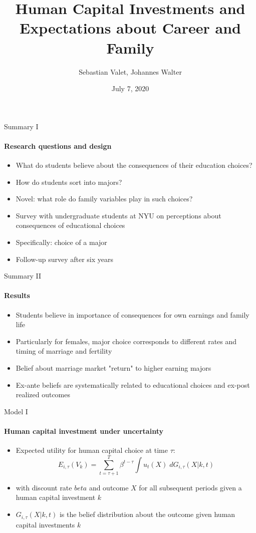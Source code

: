 \documentclass[12pt]{beamer}
\author{Sebastian Valet, Johannes Walter}
\title{Human Capital Investments and Expectations about Career and Family}
\date{July 7, 2020}
\begin{document}
\begin{frame}
\titlepage
\end{frame}


\begin{frame}{Summary I}
    \framesubtitle{Research questions and design}
        \begin{itemize}
            \item What do students believe about the consequences of their education choices?
            \item How do students sort into majors?
            \item Novel: what role do family variables play in such choices?
        \end{itemize}
    \vspace{0.5cm}
        \begin{itemize}
            \item Survey with undergraduate students at NYU on perceptions about consequences of educational choices
            \item Specifically: choice of a major
            \item Follow-up survey after six years
        \end{itemize}
\end{frame}

\begin{frame}{Summary II}
    \framesubtitle{Results}
    \begin{itemize}
        \item Students believe in importance of consequences for own earnings and family life
        \item Particularly for females, major choice corresponds to different rates and timing of marriage and fertility
        \item Belief about marriage market "return" to higher earning majors
        \item Ex-ante beliefs are systematically related to educational choices and ex-post realized outcomes
    \end{itemize}
\end{frame}

\begin{frame}{Model I}
    \framesubtitle{Human capital investment under uncertainty}
    \begin{itemize}
        \item Expected utility for human capital choice at time $\tau$: 
        $$ E_{i,\tau}(V_k) = \sum_{t = \tau + 1}^{T} \beta^{t - \tau}  \int u_t(X) \; dG_{i,\tau}(X|k,t) $$
        \item with discount rate $beta$ and outcome $X$ for all subsequent periods given a human capital investment $k$
        \item $G_{i,\tau}(X|k,t)$ is the belief distribution about the outcome given human capital investments $k$
    \end{itemize}   
\end{frame}
\end{document}
